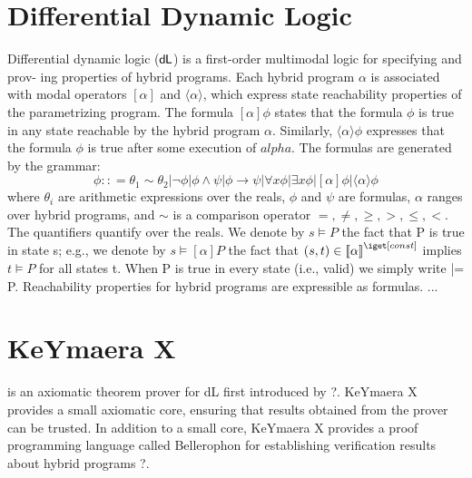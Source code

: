 \documentclass[sigconf,screen]{acmart}
\begin{document}
\section{Differential Dynamic Logic}
Differential dynamic logic ($\text{\upshape\textsf{d{\kern-0.05em}L}}$) is a first-order multimodal logic for specifying and prov- ing properties of hybrid programs. Each hybrid program $\alpha$ is associated with modal operators $[\alpha]$ and $\langle \alpha \rangle$, which express state reachability properties of the parametrizing program. The formula $[\alpha]\phi$ states that the formula $\phi$ is true in any state reachable by the hybrid program $\alpha$. Similarly, $\langle \alpha \rangle \phi$ expresses that the formula $\phi$ is true after some execution of $alpha$. The \dDL formulas are generated by the grammar:
$$ \phi :: = \theta_1 \sim \theta_2 | \neg \phi | \phi \wedge \psi | \phi \rightarrow \psi | \forall x \phi | \exists x \phi | [\alpha]\phi | \langle \alpha \rangle \phi  $$
where $\theta_i$ are arithmetic expressions over the reals, $\phi$ and $\psi$ are formulas, $\alpha$ ranges over hybrid programs, and $\sim$ is a comparison operator $=,\neq, \geq, >,\leq, <$. The quantifiers quantify over the reals. We denote by $s \models P$ the fact that P is true in state s; e.g., we denote by $s \models [\alpha]P$ the fact that $(s, t) \in \imodel[]{}{\alpha}$ implies $t \models P$ for all states t. When P is true in every state (i.e., valid) we simply write |= P.
Reachability properties for hybrid programs are expressible as \dDL formulas. ... 


\section{KeYmaera X}

is an axiomatic theorem prover for dL first introduced by ?. KeYmaera X provides a small axiomatic core, ensuring that results obtained from the prover can be trusted. In addition to a small core, KeYmaera X provides a proof programming language called Bellerophon for establishing verification results about hybrid programs ?.
 
\end{document}
